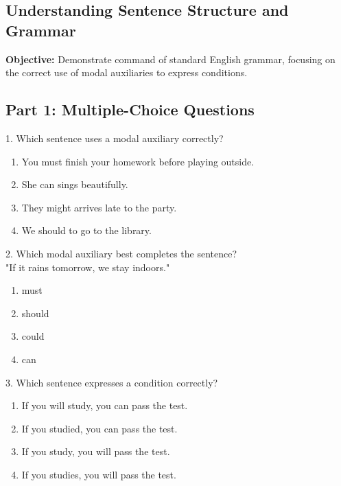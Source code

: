 \documentclass[12pt]{article}
\begin{document}
\subsection*{Understanding Sentence Structure and Grammar}
\onehalfspacing

\begin{tcolorbox}[colframe=black!40, colback=gray!0, title=Learning Objective]
\textbf{Objective:} Demonstrate command of standard English grammar, focusing on the correct use of modal auxiliaries to express conditions.
\end{tcolorbox}

\subsection*{Part 1: Multiple-Choice Questions}

1. Which sentence uses a modal auxiliary correctly?\\
\begin{enumerate}[label=\Alph*.]
    \item You must finish your homework before playing outside.  
    \item She can sings beautifully.  
    \item They might arrives late to the party.  
    \item We should to go to the library.  
\end{enumerate}

\vspace{1cm}

2. Which modal auxiliary best completes the sentence?\\
"If it rains tomorrow, we \underline{\hspace{2cm}} stay indoors."\\
\begin{enumerate}[label=\Alph*.]
    \item must  
    \item should  
    \item could  
    \item can  
\end{enumerate}

\vspace{1cm}

3. Which sentence expresses a condition correctly?\\
\begin{enumerate}[label=\Alph*.]
    \item If you will study, you can pass the test.  
    \item If you studied, you can pass the test.  
    \item If you study, you will pass the test.  
    \item If you studies, you will pass the test.  
\end{enumerate}
\end{document}
